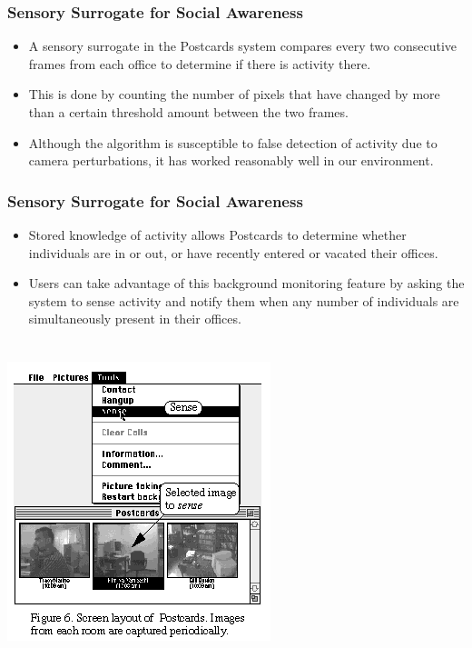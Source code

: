 \documentclass{beamer}
\begin{document}
\begin{frame}
\frametitle{Sensory Surrogate for Social Awareness}

\begin{itemize}
\item A sensory surrogate in the Postcards system compares every two consecutive frames from each office to determine if there is activity there.
\item This is done by counting the number of pixels that have changed by more than a certain threshold amount between the two frames.
\item Although the algorithm is susceptible to false detection of activity due to camera perturbations, it has worked reasonably well in our environment.
\end{itemize}

\end{frame}

\begin{frame}
\frametitle{Sensory Surrogate for Social Awareness}

\begin{itemize}
\item Stored knowledge of activity allows Postcards to determine whether individuals are in or out, or have recently entered or vacated their offices.
\item Users can take advantage of this background monitoring feature by asking the system to sense activity and notify them when any number of individuals are simultaneously present in their offices.
\end{itemize}

\end{frame}

\begin{frame}
\frametitle{}


\begin{columns}

\centerline{\includegraphics[width=0.500000\linewidth,keepaspectratio]{ky_fg6.png}}

\end{columns}

\end{frame}
\end{document}
